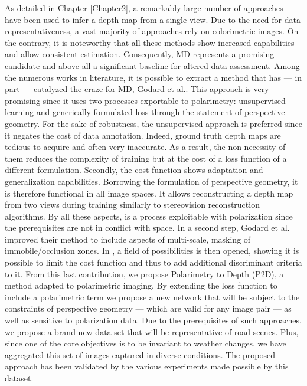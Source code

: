 As detailed in Chapter \ref{Chapter2}, a remarkably large number of approaches have been used to infer a depth map from a single view. Due to the need for data representativeness, a vast majority of approaches rely on colorimetric images. On the contrary, it is noteworthy that all these methods show increased capabilities and allow consistent estimation. Consequently, MD represents a promising candidate and above all a significant baseline for altered data assessment. Among the numerous works in literature, it is possible to extract a method that has — in part — catalyzed the craze for MD, Godard et al.\cite{godard2017unsupervised}. 
This approach is very promising since it uses two processes exportable to polarimetry: unsupervised learning and generically formulated loss through the statement of perspective geometry. For the sake of robustness, the unsupervised approach is preferred since it negates the cost of data annotation. Indeed, ground truth depth maps are tedious to acquire and often very inaccurate. As a result, the non necessity of them reduces the complexity of training but at the cost of a loss function of a different formulation. 
Secondly, the cost function shows adaptation and generalization capabilities. Borrowing the formulation of perspective geometry, it is therefore functional in all image spaces. It allows reconstructing a depth map from two views during training similarly to stereovision reconstruction algorithms.
By all these aspects, \cite{godard2017unsupervised} is a process exploitable with polarization since the prerequisites are not in conflict with space. 
In a second step, Godard et al. improved their method to include aspects of multi-scale, masking of immobile/occlusion zones. In \cite{godard2019digging}, a field of possibilities is then opened, showing it is possible to limit the cost function and thus to add additional discriminant criteria to it.
From this last contribution, we propose Polarimetry to Depth (P2D), a method adapted to polarimetric imaging. By extending the loss function to include a polarimetric term we propose a new network that will be subject to the constraints of perspective geometry — which are valid for any image pair — as well as sensitive to polarization data. Due to the prerequisites of such approaches, we propose a brand new data set that will be representative of road scenes. Plus, since one of the core objectives is to be invariant to weather changes, we have aggregated this set of images captured in diverse conditions. The proposed approach has been validated by the various experiments made possible by this dataset.
